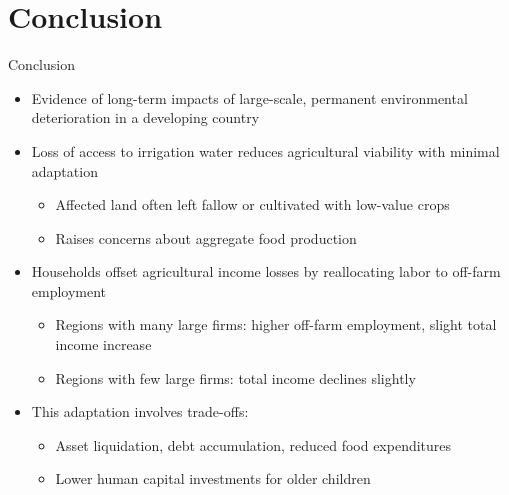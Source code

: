 \documentclass[10pt]{beamer}
\begin{document}
\section{Conclusion}
\begin{frame}
	{Conclusion}
	\begin{itemize}
		\item Evidence of long-term impacts of large-scale, permanent environmental deterioration in a developing country
		\item Loss of access to irrigation water reduces agricultural viability with minimal adaptation
		      \begin{itemize}
			      \item Affected land often left fallow or cultivated with low-value crops
			      \item Raises concerns about aggregate food production
		      \end{itemize}
		\item Households offset agricultural income losses by reallocating labor to off-farm employment
		      \begin{itemize}
			      \item Regions with many large firms: higher off-farm employment, slight total income increase
			      \item Regions with few large firms: total income declines slightly
		      \end{itemize}
		\item This adaptation involves trade-offs:
		      \begin{itemize}
			      \item Asset liquidation, debt accumulation, reduced food expenditures
			      \item Lower human capital investments for older children
		      \end{itemize}
	\end{itemize}
\end{frame}


\end{document}
